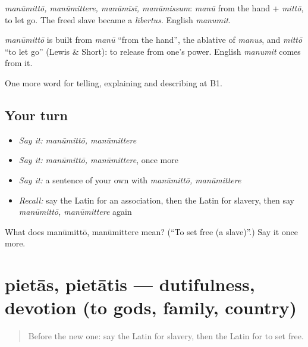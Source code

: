 \emph{manūmittō, manūmittere, manūmīsī, manūmissum}: \emph{manū} from the hand + \emph{mittō}, to let go. The freed slave became a \emph{lībertus}. English \emph{manumit}.

\begin{cousinweb}
\emph{manūmittō} is built from \emph{manū} \textquotedblleft{}from the hand\textquotedblright{}, the ablative of \emph{manus}, and \emph{mittō} \textquotedblleft{}to let go\textquotedblright{} (Lewis \& Short): to release from one's power. English \emph{manumit} comes from it.
\end{cousinweb}

\begin{grammarlens}[title={What you've built}]
One more word for telling, explaining and describing at B1.
\end{grammarlens}

\subsection*{Your turn}
\begin{itemize}
\raggedright
  \item \emph{Say it:} \emph{manūmittō, manūmittere}
  \item \emph{Say it:} \emph{manūmittō, manūmittere}, once more
  \item \emph{Say it:} a sentence of your own with \emph{manūmittō, manūmittere}
  \item \emph{Recall:} say the Latin for an association, then the Latin for slavery, then say \emph{manūmittō, manūmittere} again
\end{itemize}

\begin{tcolorbox}[breakable,colback=teal!4,colframe=teal!35!black,title={Before you move on}]
What does manūmittō, manūmittere mean? (\textquotedblleft{}To set free (a slave)\textquotedblright{}.) Say it once more.
\end{tcolorbox}
\section[pietās, pietātis]{pietās, pietātis — dutifulness, devotion (to gods, family, country)}

\label{lesson:LA-C389-pietas}



\begin{quote}
Before the new one: say the Latin for slavery, then the Latin for to set free.
\end{quote}

